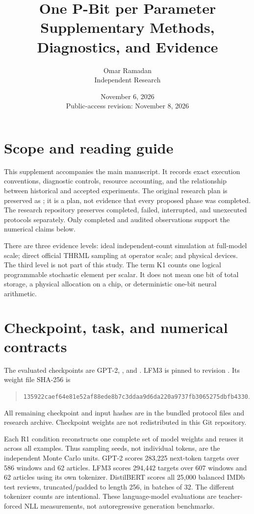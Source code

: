\documentclass[11pt]{article}
\title{One P-Bit per Parameter\\Supplementary Methods, Diagnostics, and Evidence}
\author{Omar Ramadan\\\small Independent Research}
\date{November 6, 2026\\\small Public-access revision: November 8, 2026}
\begin{document}
\maketitle
\tableofcontents

\section{Scope and reading guide}
This supplement accompanies the main manuscript. It records exact execution conventions, diagnostic controls, resource accounting, and the relationship between historical and accepted experiments. The original research plan is preserved as ; it is a plan, not evidence that every proposed phase was completed. The research repository preserves completed, failed, interrupted, and unexecuted protocols separately. Only completed and audited observations support the numerical claims below.

There are three evidence levels: ideal independent-count simulation at full-model scale; direct official THRML sampling at operator scale; and physical devices. The third level is not part of this study. The term K1 counts one logical programmable stochastic element per scalar. It does not mean one bit of total storage, a physical allocation on a chip, or deterministic one-bit neural arithmetic.

\section{Checkpoint, task, and numerical contracts}
The evaluated checkpoints are GPT-2, , and . LFM3 is pinned to revision . Its weight file SHA-256 is
\begin{quote}\small\nolinkurl{135922caef64e81e52af88ede8b7c3ddaa9d6da220a9737fb3065275dbfb4330}.\end{quote}
All remaining checkpoint and input hashes are in the bundled protocol files and research archive. Checkpoint weights are not redistributed in this Git repository.

Each R1 condition reconstructs one complete set of model weights and reuses it across all examples. Thus sampling seeds, not individual tokens, are the independent Monte Carlo units. GPT-2 scores 283,225 next-token targets over 586 windows and 62 articles. LFM3 scores 294,442 targets over 607 windows and 62 articles using its own tokenizer. DistilBERT scores all 25,000 balanced IMDb test reviews, truncated/padded to length 256, in batches of 32. The different tokenizer counts are intentional. These language-model evaluations are teacher-forced NLL measurements, not autoregressive generation benchmarks.
\end{document}
